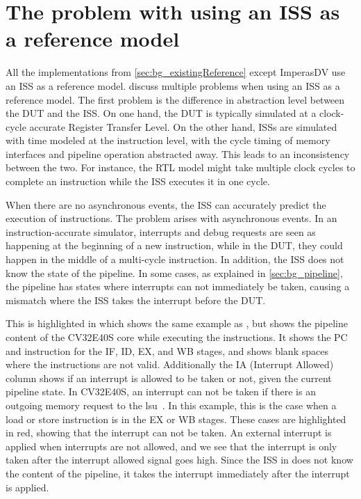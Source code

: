 %
%






\section{The problem with using an ISS as a reference model}
\label{sec:back_issProblem}



All the implementations from \cref{sec:bg_existingReference} except ImperasDV use an ISS as a reference model. \textcite{taylorAdvancedRISCVVerification2023}  discuss multiple problems when using an ISS as a reference model. The first problem is the difference in abstraction level between the DUT and the ISS. On one hand, the DUT is typically simulated at a clock-cycle accurate Register Transfer Level. On the other hand, ISSs are simulated with time modeled at the instruction level, with the cycle timing of memory interfaces and pipeline operation abstracted away. This leads to an inconsistency between the two. For instance, the RTL model might take multiple clock cycles to complete an instruction while the ISS executes it in one cycle.

When there are no asynchronous events, the ISS can accurately predict the execution of instructions. The problem arises with asynchronous events. In an instruction-accurate simulator, interrupts and debug requests are seen as happening at the beginning of a new instruction, while in the DUT, they could happen in the middle of a multi-cycle instruction. In addition, the ISS does not know the state of the pipeline. In some cases, as explained in \cref{sec:bg_pipeline}, the pipeline has states where interrupts can not immediately be taken, causing a mismatch where the ISS takes the interrupt before the DUT.

This is highlighted in  which shows the same example as , but shows the pipeline content of the CV32E40S core while executing the instructions. It shows the PC and instruction for the IF, ID, EX, and WB stages, and shows blank spaces where the instructions are not valid. Additionally the IA (Interrupt Allowed) column shows if an interrupt is allowed to be taken or not, given the current pipeline state. In CV32E40S, an interrupt can not be taken if there is an outgoing memory request to the \acrshort{lsu}~\cite{openhwgroupExceptionsInterruptsCOREV2023}. In this example, this is the case when a load or store instruction is in the EX or WB stages. These cases are highlighted in red, showing that the interrupt can not be taken. An external interrupt is applied when interrupts are not allowed, and we see that the interrupt is only taken after the interrupt allowed signal goes high. Since the ISS in  does not know the content of the pipeline, it takes the interrupt immediately after the interrupt is applied.

